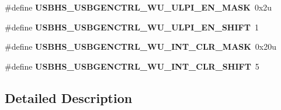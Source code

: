 \begin{DoxyCompactItemize}
\item 
\hypertarget{group___u_s_b_h_s___register___masks_gaa555058834ad699a8683547ff863ab0b}{}\#define {\bfseries U\+S\+B\+H\+S\+\_\+\+U\+S\+B\+G\+E\+N\+C\+T\+R\+L\+\_\+\+W\+U\+\_\+\+U\+L\+P\+I\+\_\+\+E\+N\+\_\+\+M\+A\+S\+K}~0x2u\label{group___u_s_b_h_s___register___masks_gaa555058834ad699a8683547ff863ab0b}

\item 
\hypertarget{group___u_s_b_h_s___register___masks_gace625a4da7d5a125b336a43f1c51f077}{}\#define {\bfseries U\+S\+B\+H\+S\+\_\+\+U\+S\+B\+G\+E\+N\+C\+T\+R\+L\+\_\+\+W\+U\+\_\+\+U\+L\+P\+I\+\_\+\+E\+N\+\_\+\+S\+H\+I\+F\+T}~1\label{group___u_s_b_h_s___register___masks_gace625a4da7d5a125b336a43f1c51f077}

\item 
\hypertarget{group___u_s_b_h_s___register___masks_gaf244230487c66b7158095d55c029263c}{}\#define {\bfseries U\+S\+B\+H\+S\+\_\+\+U\+S\+B\+G\+E\+N\+C\+T\+R\+L\+\_\+\+W\+U\+\_\+\+I\+N\+T\+\_\+\+C\+L\+R\+\_\+\+M\+A\+S\+K}~0x20u\label{group___u_s_b_h_s___register___masks_gaf244230487c66b7158095d55c029263c}

\item 
\hypertarget{group___u_s_b_h_s___register___masks_gaf0c5930ff2093f4738b2624e99b23c2b}{}\#define {\bfseries U\+S\+B\+H\+S\+\_\+\+U\+S\+B\+G\+E\+N\+C\+T\+R\+L\+\_\+\+W\+U\+\_\+\+I\+N\+T\+\_\+\+C\+L\+R\+\_\+\+S\+H\+I\+F\+T}~5\label{group___u_s_b_h_s___register___masks_gaf0c5930ff2093f4738b2624e99b23c2b}

\end{DoxyCompactItemize}


\subsection{Detailed Description}
